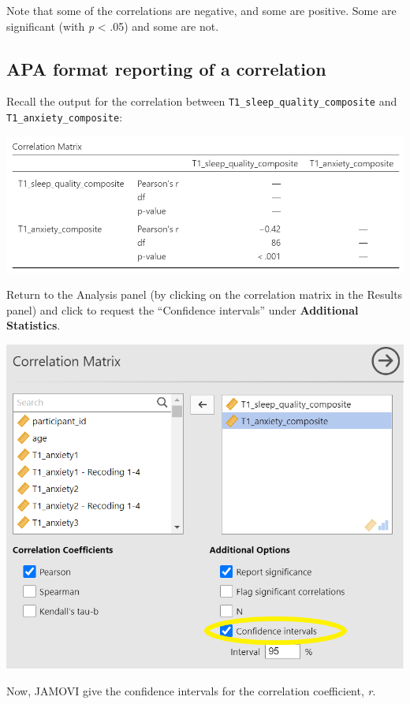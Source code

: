 \documentclass[
]{book}
\begin{document}
Note that some of the correlations are negative, and some are positive. Some are significant (with \emph{p} \textless{} .05) and some are not.

\hypertarget{apa-format-reporting-of-a-correlation}{%
\subsection{APA format reporting of a correlation}\label{apa-format-reporting-of-a-correlation}}

Recall the output for the correlation between \texttt{T1\_sleep\_quality\_composite} and \texttt{T1\_anxiety\_composite}:

\includegraphics{img/CorrelationMatrixVersionB.png}

Return to the Analysis panel (by clicking on the correlation matrix in the Results panel) and click to request the ``Confidence intervals'' under \textbf{Additional Statistics}.

\includegraphics{img/CorrelationAddCIsWithHighlighting.png}

Now, JAMOVI give the confidence intervals for the correlation coefficient, \emph{r}.
\end{document}
